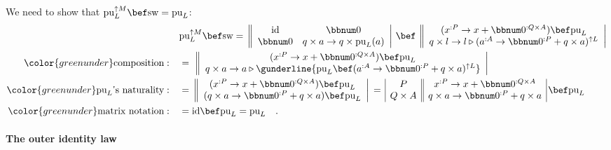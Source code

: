 We need to show that $\text{pu}_{L}^{\uparrow M}\bef\text{sw}=\text{pu}_{L}$:
\begin{align*}
 & \text{pu}_{L}^{\uparrow M}\bef\text{sw}=\,\left\Vert \begin{array}{cc}
\text{id} & \bbnum 0\\
\bbnum 0 & q\times a\rightarrow q\times\text{pu}_{L}(a)
\end{array}\right|\,\bef\,\left\Vert \begin{array}{c}
(x^{:P}\rightarrow x+\bbnum 0^{:Q\times A})\bef\text{pu}_{L}\\
q\times l\rightarrow l\triangleright(a^{:A}\rightarrow\bbnum 0^{:P}+q\times a)^{\uparrow L}
\end{array}\right|\\
{\color{greenunder}\text{composition}:}\quad & =\,\,\left\Vert \begin{array}{c}
(x^{:P}\rightarrow x+\bbnum 0^{:Q\times A})\bef\text{pu}_{L}\\
q\times a\rightarrow a\triangleright\gunderline{\text{pu}_{L}\bef(a^{:A}\rightarrow\bbnum 0^{:P}+q\times a)^{\uparrow L}}
\end{array}\right|\\
{\color{greenunder}\text{pu}_{L}\text{\textsf{'}s naturality}:}\quad & =\,\left\Vert \begin{array}{c}
(x^{:P}\rightarrow x+\bbnum 0^{:Q\times A})\bef\text{pu}_{L}\\
(q\times a\rightarrow\bbnum 0^{:P}+q\times a)\bef\text{pu}_{L}
\end{array}\right|\,=\,\begin{array}{|c||c|}
P & x^{:P}\rightarrow x+\bbnum 0^{:Q\times A}\\
Q\times A & q\times a\rightarrow\bbnum 0^{:P}+q\times a
\end{array}\,\bef\text{pu}_{L}\\
{\color{greenunder}\text{matrix notation}:}\quad & =\text{id}\bef\text{pu}_{L}=\text{pu}_{L}\quad.
\end{align*}


\paragraph{The outer identity law}

